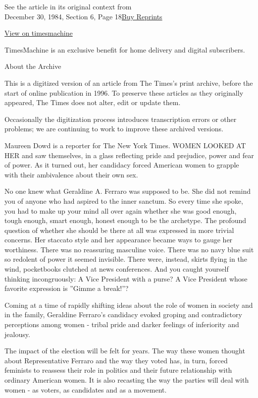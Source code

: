 See the article in its original context from\\
December 30, 1984, Section 6, Page
18\href{https://store.nytimes.com/collections/new-york-times-page-reprints?utm_source=nytimes\&utm_medium=article-page\&utm_campaign=reprints}{Buy
Reprints}

\href{http://timesmachine.nytimes.com/timesmachine/1984/12/30/177726.html}{View
on timesmachine}

TimesMachine is an exclusive benefit for home delivery and digital
subscribers.

About the Archive

This is a digitized version of an article from The Times's print
archive, before the start of online publication in 1996. To preserve
these articles as they originally appeared, The Times does not alter,
edit or update them.

Occasionally the digitization process introduces transcription errors or
other problems; we are continuing to work to improve these archived
versions.

Maureen Dowd is a reporter for The New York Times. WOMEN LOOKED AT HER
and saw themselves, in a glass reflecting pride and prejudice, power and
fear of power. As it turned out, her candidacy forced American women to
grapple with their ambivalence about their own sex.

No one knew what Geraldine A. Ferraro was supposed to be. She did not
remind you of anyone who had aspired to the inner sanctum. So every time
she spoke, you had to make up your mind all over again whether she was
good enough, tough enough, smart enough, honest enough to be the
archetype. The profound question of whether she should be there at all
was expressed in more trivial concerns. Her staccato style and her
appearance became ways to gauge her worthiness. There was no reassuring
masculine voice. There was no navy blue suit so redolent of power it
seemed invisible. There were, instead, skirts flying in the wind,
pocketbooks clutched at news conferences. And you caught yourself
thinking incongruously: A Vice President with a purse? A Vice President
whose favorite expression is ''Gimme a break!''?

Coming at a time of rapidly shifting ideas about the role of women in
society and in the family, Geraldine Ferraro's candidacy evoked groping
and contradictory perceptions among women - tribal pride and darker
feelings of inferiority and jealousy.

The impact of the election will be felt for years. The way these women
thought about Representative Ferraro and the way they voted has, in
turn, forced feminists to reassess their role in politics and their
future relationship with ordinary American women. It is also recasting
the way the parties will deal with women - as voters, as candidates and
as a movement.

